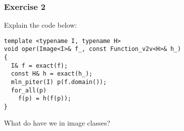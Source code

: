 \documentclass{beamer}
\begin{document}
\begin{frame}[fragile]
  \frametitle{Exercise 2}

Explain the code below:

\begin{lstlisting}
template <typename I, typename H>
void oper(Image<I>& f_, const Function_v2v<H>& h_)
{
  I& f = exact(f);
  const H& h = exact(h_);
  mln_piter(I) p(f.domain());
  for_all(p)
    f(p) = h(f(p));
}
\end{lstlisting}

\smallskip

What do have we in image classes?

\end{frame}



\end{document}
